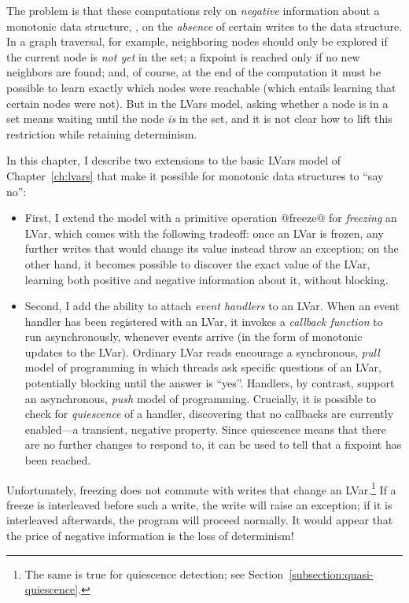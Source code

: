 The problem is that these computations rely on \emph{negative}
information about a monotonic data structure, \ie, on the
\emph{absence} of certain writes to the data structure.  In a graph
traversal, for example, neighboring nodes should only be explored if
the current node is \emph{not yet} in the set; a fixpoint is reached
only if no new neighbors are found; and, of course, at the end of the
computation it must be possible to learn exactly which nodes were
reachable (which entails learning that certain nodes were not).  But
in the LVars model, asking whether a node is in a set means waiting
until the node \emph{is} in the set, and it is not clear how to lift
this restriction while retaining determinism.

In this chapter, I describe two extensions to the basic LVars model of
Chapter~\ref{ch:lvars} that make it possible for monotonic data
structures to ``say no'':

\begin{itemize}
\item First, I extend the model with a primitive operation @freeze@
  for \emph{freezing} an LVar, which comes with the following
  tradeoff: once an LVar is frozen, any further writes that would
  change its value instead throw an exception; on the other hand, it
  becomes possible to discover the exact value of the LVar, learning
  both positive and negative information about it, without blocking.
\item
  Second, I add the ability to attach \emph{event handlers} to an
  LVar.  When an event handler has been registered with an LVar, it
  invokes a \emph{callback function} to run asynchronously, whenever
  events arrive (in the form of monotonic updates to the LVar).
  Ordinary LVar reads encourage a synchronous, \emph{pull} model of
  programming in which threads ask specific questions of an LVar,
  potentially blocking until the answer is ``yes''.  Handlers, by
  contrast, support an asynchronous, \emph{push} model of programming.
  Crucially, it is possible to check for \emph{quiescence} of a
  handler, discovering that no callbacks are currently enabled---a
  transient, negative property.  Since quiescence means that there are
  no further changes to respond to, it can be used to tell that a
  fixpoint has been reached.
\end{itemize}

Unfortunately, freezing does not commute with writes that change an
LVar.\footnote{The same is true for quiescence detection; see
Section~\ref{subsection:quasi-quiescence}.}  If a freeze is
interleaved before such a write, the write will raise an exception; if
it is interleaved afterwards, the program will proceed normally.  It
would appear that the price of negative information is the loss of
determinism!

